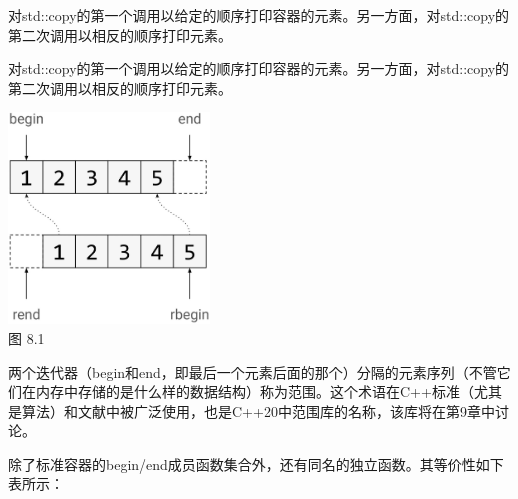 对std::copy的第一个调用以给定的顺序打印容器的元素。另一方面，对std::copy的第二次调用以相反的顺序打印元素。

对std::copy的第一个调用以给定的顺序打印容器的元素。另一方面，对std::copy的第二次调用以相反的顺序打印元素。

\begin{center}
\includegraphics[width=0.4\textwidth]{images/1.png}\\
图 8.1
\end{center}

两个迭代器（begin和end，即最后一个元素后面的那个）分隔的元素序列（不管它们在内存中存储的是什么样的数据结构）称为范围。这个术语在C++标准（尤其是算法）和文献中被广泛使用，也是C++20中范围库的名称，该库将在第9章中讨论。

除了标准容器的begin/end成员函数集合外，还有同名的独立函数。其等价性如下表所示：

